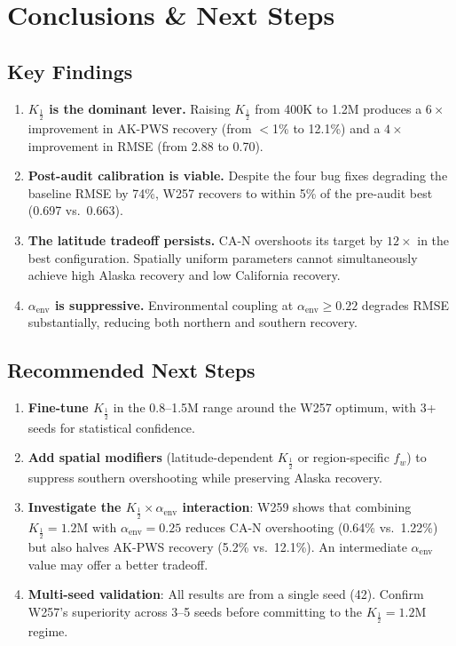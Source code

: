 \documentclass[11pt,a4paper,oneside]{article}
\begin{document}
\clearpage

\section{Conclusions \& Next Steps}

\subsection{Key Findings}

\begin{enumerate}[nosep]
    \item \textbf{$K_{\frac{1}{2}}$ is the dominant lever.} Raising $K_{\frac{1}{2}}$ from 400K to 1.2M produces a $6\times$ improvement in AK-PWS recovery (from $<$1\% to 12.1\%) and a $4\times$ improvement in RMSE (from 2.88 to 0.70).
    \item \textbf{Post-audit calibration is viable.} Despite the four bug fixes degrading the baseline RMSE by 74\%, W257 recovers to within 5\% of the pre-audit best (0.697 vs.\ 0.663).
    \item \textbf{The latitude tradeoff persists.} CA-N overshoots its target by $12\times$ in the best configuration. Spatially uniform parameters cannot simultaneously achieve high Alaska recovery and low California recovery.
    \item \textbf{$\alpha_{\text{env}}$ is suppressive.} Environmental coupling at $\alpha_{\text{env}} \geq 0.22$ degrades RMSE substantially, reducing both northern and southern recovery.
\end{enumerate}

\subsection{Recommended Next Steps}

\begin{enumerate}[nosep]
    \item \textbf{Fine-tune $K_{\frac{1}{2}}$} in the 0.8--1.5M range around the W257 optimum, with 3+ seeds for statistical confidence.
    \item \textbf{Add spatial modifiers} (latitude-dependent $K_{\frac{1}{2}}$ or region-specific $f_w$) to suppress southern overshooting while preserving Alaska recovery.
    \item \textbf{Investigate the $K_{\frac{1}{2}} \times \alpha_{\text{env}}$ interaction}: W259 shows that combining $K_{\frac{1}{2}} = 1.2\text{M}$ with $\alpha_{\text{env}} = 0.25$ reduces CA-N overshooting (0.64\% vs.\ 1.22\%) but also halves AK-PWS recovery (5.2\% vs.\ 12.1\%). An intermediate $\alpha_{\text{env}}$ value may offer a better tradeoff.
    \item \textbf{Multi-seed validation}: All results are from a single seed (42). Confirm W257's superiority across 3--5 seeds before committing to the $K_{\frac{1}{2}} = 1.2\text{M}$ regime.
\end{enumerate}
\end{document}
